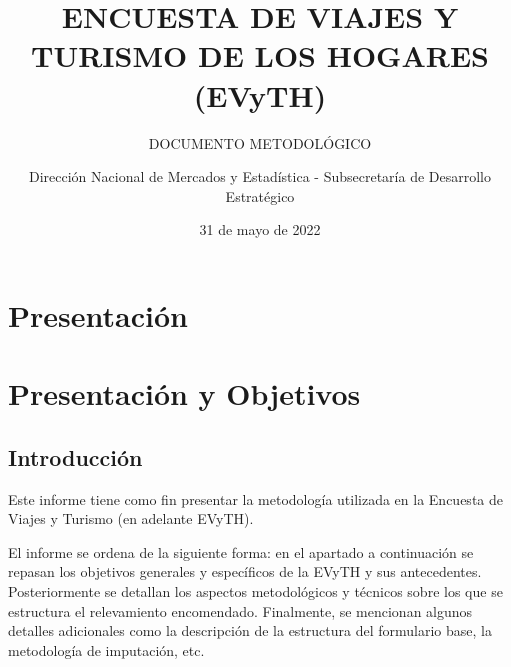 \documentclass[
  openany]{book}
\title{ENCUESTA DE VIAJES Y TURISMO DE LOS HOGARES (EVyTH)}
\subtitle{DOCUMENTO METODOLÓGICO}
\author{Dirección Nacional de Mercados y Estadística - Subsecretaría de Desarrollo Estratégico}
\date{31 de mayo de 2022}
\let\oldmaketitle\maketitle
\begin{document}
\maketitle


\newpage

\let\maketitle\oldmaketitle
\maketitle

{
\setcounter{tocdepth}{1}
\tableofcontents
}
\hypertarget{presentaciuxf3n}{%
\chapter*{Presentación}\label{presentaciuxf3n}}

\hypertarget{section}{%
\subsection*{}\label{section}}

\hypertarget{presentacion-objetivos}{%
\chapter{\texorpdfstring{\textbf{Presentación y Objetivos}}{Presentación y Objetivos}}\label{presentacion-objetivos}}

\hypertarget{introducciuxf3n}{%
\section{Introducción}\label{introducciuxf3n}}

Este informe tiene como fin presentar la metodología utilizada en la Encuesta de Viajes y Turismo (en adelante EVyTH).

El informe se ordena de la siguiente forma: en el apartado a continuación se repasan los objetivos generales y específicos de la EVyTH y sus antecedentes. Posteriormente se detallan los aspectos metodológicos y técnicos sobre los que se estructura el relevamiento encomendado. Finalmente, se mencionan algunos detalles adicionales como la descripción de la estructura del formulario base, la metodología de imputación, etc.
\end{document}
